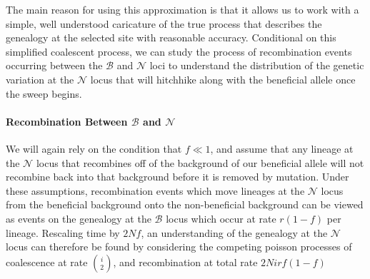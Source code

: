 \documentclass[a4paper,10pt]{article}
\newcommand{\fancyN}{$\mathcal N$ }
\newcommand{\fancyB}{$\mathcal B$ }
\begin{document}
The main reason for using this approximation is that it allows us to work with a simple, well understood caricature of the true process that describes the genealogy at the selected site with reasonable accuracy. Conditional on this simplified coalescent process, we can study the process of recombination events occurring between the \fancyB and \fancyN loci to understand the distribution of the genetic variation at the \fancyN locus that will hitchhike along with the beneficial allele once the sweep begins. 

\paragraph{Recombination Between \fancyB and \fancyN}
We will again rely on the condition that $f \ll 1$, and assume that any lineage at the \fancyN locus that recombines off of the background of our beneficial allele will not recombine back into that background before it is removed by mutation. Under these assumptions, recombination events which move lineages at the \fancyN locus from the beneficial background onto the non-beneficial background can be viewed as events on the genealogy at the \fancyB locus which occur at rate $r\left(1-f\right)$ per lineage. Rescaling time by $2Nf$, an understanding of the genealogy at the \fancyN locus can therefore be found by considering the competing poisson processes of coalescence at rate ${i \choose 2}$, and recombination at total rate $2Nirf(1-f)$


\end{document}
